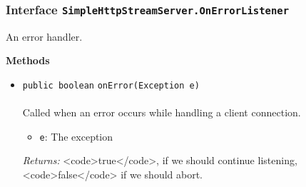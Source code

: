 \subsubsection{Interface \lstinline|SimpleHttpStreamServer.OnErrorListener|}
An error handler. \\
\noindent\begin{minipage}[t]{5cm}
\vspace{0.3em}
\hspace*{2em}
\vspace{0.3em}
\end{minipage}





\textbf{\sffamily Methods}
\begin{itemize}
\item \lstinline|public boolean| \lstinline|onError|\lstinline|(Exception e)|\\ \\[-0.6em]
Called when an error occurs while handling a client connection.
\begin{itemize}
\item \lstinline|e|: The exception
\end{itemize}

\emph{Returns:} <code>true</code>, if we should continue listening,
 <code>false</code> if we should abort.

\end{itemize}


